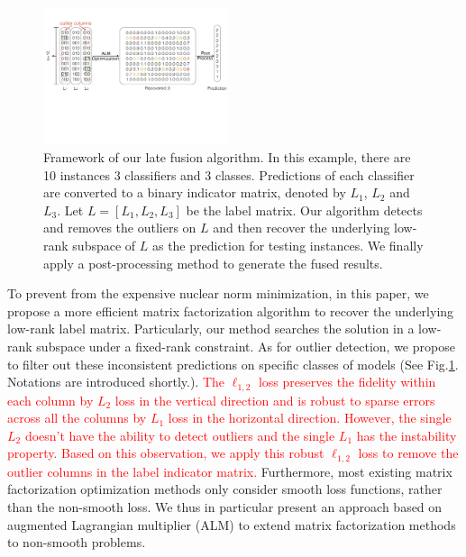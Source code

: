 \documentclass[10pt,twocolumn,letterpaper]{article}
\def\calC{{\mathcal{C}}}
\def\yanred{\textcolor{red}}
\begin{document}
\begin{figure}[!t]
\begin{center}
\includegraphics[width=0.48\textwidth]{resource/frame_work.pdf}
\end{center}
\caption{Framework of our late fusion algorithm.
In this example, there are 10 instances 3 classifiers and 3 classes.
Predictions of each classifier are converted to a binary indicator matrix,
denoted by $L_1$, $L_2$ and $L_3$.
Let $L = [L_1, L_2, L_3]$ be the label matrix.
Our algorithm detects and removes the outliers on $L$ and then recover the underlying low-rank subspace of $L$ as the prediction for testing instances.
We finally apply a post-processing method to generate the fused results.
}
\label{fig:framework}
\end{figure}

To prevent from the expensive nuclear norm minimization,
in this paper, we propose a more efficient matrix factorization algorithm to recover the underlying low-rank label matrix.
Particularly, our method searches the solution in a low-rank subspace under a fixed-rank constraint.
As for outlier detection,
we propose to filter out these inconsistent predictions on specific classes of models (See Fig.\ref{fig:framework}.
Notations are introduced shortly.).
\yanred{
The $\ell_{1,2}$ loss preserves the fidelity within each column by $L_2$ loss in the vertical direction and is robust to sparse errors across all the columns by $L_1$ loss in the horizontal direction.
However, the single $L_2$ doesn't have the ability to detect outliers and the single $L_1$ has the instability property.
Based on this observation, we apply this robust $\ell_{1,2}$ loss to remove the outlier columns in the label indicator matrix.
}
Furthermore, most existing matrix factorization optimization methods only consider smooth loss functions, rather than the non-smooth loss.
We thus in particular present an approach based on augmented Lagrangian multiplier (ALM) to extend matrix factorization methods to non-smooth problems.
\end{document}
